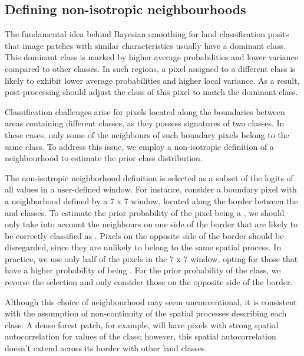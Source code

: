 \documentclass[
  shortnames]{jss}
\begin{document}
\hypertarget{defining-non-isotropic-neighbourhoods}{%
\subsection{Defining non-isotropic neighbourhoods}\label{defining-non-isotropic-neighbourhoods}}

The fundamental idea behind Bayesian smoothing for land classification posits that image patches with similar characteristics usually have a dominant class. This dominant class is marked by higher average probabilities and lower variance compared to other classes. In such regions, a pixel assigned to a different class is likely to exhibit lower average probabilities and higher local variance. As a result, post-processing should adjust the class of this pixel to match the dominant class.

Classification challenges arise for pixels located along the boundaries between areas containing different classes, as they possess signatures of two classes. In these cases, only some of the neighbours of such boundary pixels belong to the same class. To address this issue, we employ a non-isotropic definition of a neighbourhood to estimate the prior class distribution.

The non-isotropic neighborhood definition is selected as a subset of the logits of all values in a user-defined window. For instance, consider a boundary pixel with a neighborhood defined by a 7 x 7 window, located along the border between the  and  classes. To estimate the prior probability of the pixel being a , we should only take into account the neighbours on one side of the border that are likely to be correctly classified as . Pixels on the opposite side of the border should be disregarded, since they are unlikely to belong to the same spatial process. In practice, we use only half of the pixels in the 7 x 7 window, opting for those that have a higher probability of being . For the prior probability of the  class, we reverse the selection and only consider those on the opposite side of the border.

Although this choice of neighbourhood may seem unconventional, it is consistent with the assumption of non-continuity of the spatial processes describing each class. A dense forest patch, for example, will have pixels with strong spatial autocorrelation for values of the  class; however, this spatial autocorrelation doesn't extend across its border with other land classes.
\end{document}

